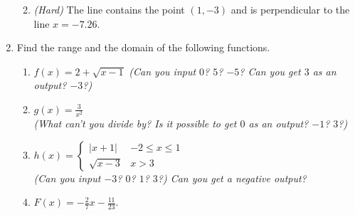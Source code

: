 \documentclass[12 pt]{article}
\begin{document}
\begin{enumerate}
\begin{enumerate}
      \vspace{6cm}
      \item \textit{(Hard)} The line contains the point $(1, -3)$ and is
      perpendicular to the line $x = -7.26$.
      \vspace{6cm}
    \end{enumerate}
    \item Find the range and the domain of the following functions.
    \begin{enumerate}
      \item $f(x) = 2 + \sqrt{x - 1}$
      \textit{(Can you input $0$? $5$? $-5$? Can you get $3$ as an output? $-3$?)}
      \pagebreak
      \item $\displaystyle g(x) = \frac{3}{x^2}$ \\
      \textit{(What can't you divide by? Is it possible to get $0$ as an output? $-1$? $3$?)}
      \vspace{6cm}
      \item $
      \displaystyle h(x) = \begin{cases}
        |x + 1| & -2 \leq x \leq 1 \\
        \sqrt{x - 3} & x > 3
      \end{cases}
      $
      \\
      \textit{(Can you input $-3$? $0$? $1$? $3$?) Can you get a negative output?}
      \vspace{10cm}
      \item $\displaystyle F(x) = -\frac{2}{7}x - \frac{11}{23}$.
    \end{enumerate}
  \end{enumerate}
\end{document}

